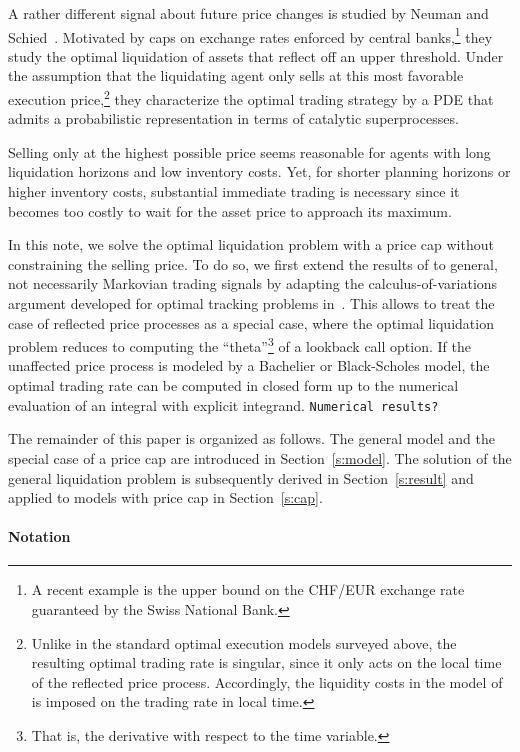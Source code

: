 \documentclass[11pt]{article}
\theoremstyle{definition}
\theoremstyle{remark}
\begin{document}
A rather different signal about future price changes is studied by Neuman and Schied~\cite{neuman.schied.16}. Motivated by caps on exchange rates enforced by central banks,\footnote{A recent example is the upper bound on the CHF/EUR exchange rate guaranteed by the Swiss National Bank.} they study the optimal liquidation of assets that reflect off an upper threshold.  Under the assumption that the liquidating agent only sells at this most favorable execution price,\footnote{Unlike in the standard optimal execution models surveyed above, the resulting optimal trading rate is singular, since it only acts on the local time of the reflected price process. Accordingly, the liquidity costs in the model of \cite{neuman.schied.16} is imposed on the trading rate in local time.} they characterize the optimal trading strategy by a PDE that admits a probabilistic representation in terms of catalytic superprocesses. 

Selling only at the highest possible price seems reasonable for agents with long liquidation horizons and low inventory costs. Yet, for shorter planning horizons or higher inventory costs, substantial immediate trading is necessary since it becomes too costly to wait for the asset price to approach its maximum.

In this note, we solve the optimal liquidation problem with a price cap without constraining the selling price. To do so, we first extend the results of \cite{lehalle2017incorporating} to general, not necessarily Markovian trading signals by adapting the calculus-of-variations argument developed for optimal tracking problems in~\cite{bank2017hedging,bouchard2017equilibrium}. This allows to treat the case of reflected price processes as a special case, where the optimal liquidation problem reduces to computing the ``theta''\footnote{That is, the derivative with respect to the time variable.} of a lookback call option. If the unaffected price process is modeled by a Bachelier or Black-Scholes model, the optimal trading rate can be computed in closed form up to the numerical evaluation of an integral with explicit integrand. {\color{red}\texttt{Numerical results?}}

The remainder of this paper is organized as follows. The general model and the special case of a price cap are introduced in Section~\ref{s:model}. The solution of the general liquidation problem is subsequently derived in Section~\ref{s:result} and applied to models with price cap in Section~\ref{s:cap}.

\paragraph{Notation}
\end{document}
